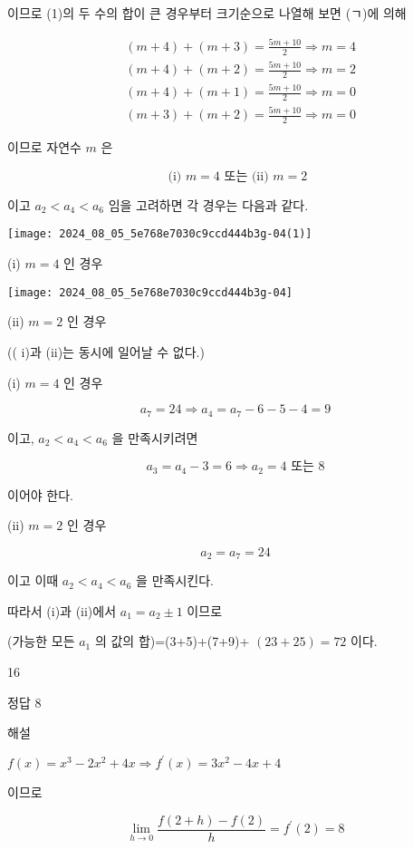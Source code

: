 \documentclass[10pt]{article}
\begin{document}
이므로 (1)의 두 수의 합이 큰 경우부터 크기순으로 나열해 보면 (ㄱ)에 의해

\[
\begin{aligned}
& (m+4)+(m+3)=\frac{5 m+10}{2} \Rightarrow m=4 \\
& (m+4)+(m+2)=\frac{5 m+10}{2} \Rightarrow m=2 \\
& (m+4)+(m+1)=\frac{5 m+10}{2} \Rightarrow m=0 \\
& (m+3)+(m+2)=\frac{5 m+10}{2} \Rightarrow m=0
\end{aligned}
\]

이므로 자연수 \(m\) 은

\[
\text { (i) } m=4 \text { 또는 (ii) } m=2
\]

이고 \(a_{2}<a_{4}<a_{6}\) 임을 고려하면 각 경우는 다음과 같다.

\begin{center}
\texttt{[image: 2024\_08\_05\_5e768e7030c9ccd444b3g-04(1)]}
\end{center}

(i) \(m=4\) 인 경우

\begin{center}
\texttt{[image: 2024\_08\_05\_5e768e7030c9ccd444b3g-04]}
\end{center}

(ii) \(m=2\) 인 경우

(( i)과 (ii)는 동시에 일어날 수 없다.)

(i) \(m=4\) 인 경우

\[
a_{7}=24 \Rightarrow a_{4}=a_{7}-6-5-4=9
\]

이고, \(a_{2}<a_{4}<a_{6}\) 을 만족시키려면

\[
a_{3}=a_{4}-3=6 \Rightarrow a_{2}=4 \text { 또는 } 8
\]

이어야 한다.

(ii) \(m=2\) 인 경우

\[
a_{2}=a_{7}=24
\]

이고 이때 \(a_{2}<a_{4}<a_{6}\) 을 만족시킨다.

따라서 (i)과 (ii)에서 \(a_{1}=a_{2} \pm 1\) 이므로

(가능한 모든 \(a_{1}\) 의 값의 합)=(3+5)+(7+9)+ \((23+25)=72\) 이다.

16

정답 8

해설

\(f(x)=x^{3}-2 x^{2}+4 x \Rightarrow f^{\prime}(x)=3 x^{2}-4 x+4\)

이므로

\[
\lim _{h \rightarrow 0} \frac{f(2+h)-f(2)}{h}=f^{\prime}(2)=8
\]
\end{document}
